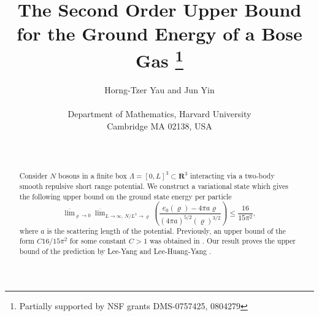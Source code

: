 \documentclass[11pt]{article}
\newcommand\version{11-19, 2026}
\numberwithin{equation}{section}
\renewcommand\rho\varrho
\theoremstyle{definition}
\begin{document}


\title{The Second Order Upper Bound for the Ground Energy of a Bose Gas \thanks{Partially supported
by NSF grants DMS-0757425, 0804279}
}

\author{Horng-Tzer  Yau  and  Jun  Yin \\ \\
Department of Mathematics, Harvard University\\
Cambridge MA 02138, USA \\ \\
\\}






\maketitle


\begin{abstract} 
Consider $N$  bosons in a finite box $\Lambda= [0,L]^3\subset \mathbf R^3$
interacting via a two-body  smooth repulsive  short range potential. 
We construct a variational state which gives the following 
upper bound on the ground state energy
per particle 
\[
\overline\lim_{\rho\to0} \overline \lim_{L \to \infty, \, N/L^3 \to \rho} \left(
\frac{e_0(\rho)- 4 \pi a \rho }{(4 \pi a)^{5/2}( \rho )^{3/2} }\right)\leq \frac{16}{15\pi^2},
\]
where $a$ is the scattering length of the potential.  Previously, an upper bound 
of the form $C 16/15\pi^2$ for some constant $C > 1$ was obtained in \cite{ESY}.
Our result  proves the upper bound of the  prediction by Lee-Yang \cite{LYang} and  Lee-Huang-Yang \cite{LHY}. 


\end{abstract} 

\renewcommand{\thefootnote}{${\,}$}
\renewcommand{\thefootnote}{${\, }$}
\renewcommand{\thefootnote}{\arabic{footnote}}
\end{document}
